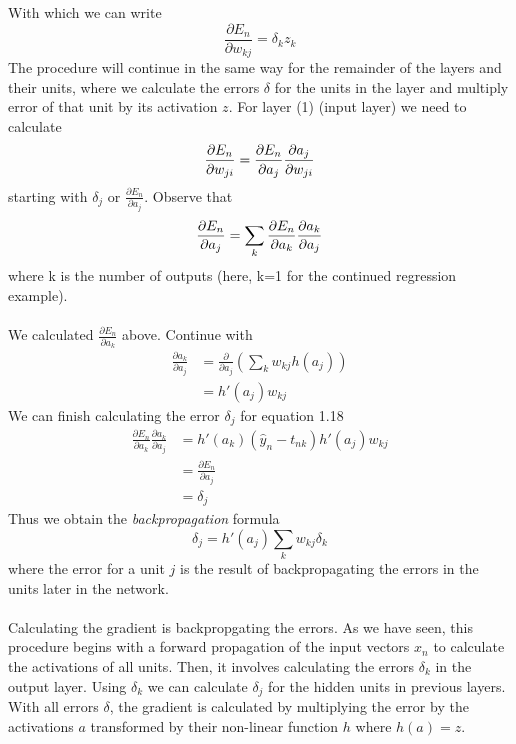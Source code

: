 With which we can write
\begin{equation}
    \frac{\partial{E_n}}{\partial w_{kj}} = \delta_{k}z_{k}
\end{equation}
The procedure will continue in the same way for the remainder of the layers and their 
units, where we calculate the errors $\delta$ for the units in the layer and multiply 
error of that unit by its activation $z$. For layer (1) (input layer) we need to calculate
\begin{equation}
    \frac{\partial E_n}{\partial w_{ji}} = \frac{\partial E_n}{\partial a_j} \\
    \frac{\partial a_j}{\partial w_{ji}}
\end{equation}
starting with $\delta_{j}$ or $\frac{\partial E_{n}}{\partial a_{j}}$. 
Observe that 
\begin{equation}
    \frac{\partial E_n}{\partial a_j} = \sum_{k} \\
    \frac{\partial E_n}{\partial a_{k}} \frac{\partial a_{k}}{\partial a_{j}}
\end{equation} where k is the number of outputs (here, k=1 for the continued
regression example).
\\\\
We calculated $\frac{\partial E_{n}}{\partial a_{k}}$ above. Continue with 
\begin{equation}
    \begin{split}
    \frac{\partial a_k}{\partial a_{j}} &= \frac{\partial}{\partial a_{j}} \left( \sum_{k} w_{kj}h(a_{j}) \right) \\
    &= h'(a_{j})w_{kj}
    \end{split}
\end{equation} 
We can finish calculating the error $\delta_{j}$ for equation 1.18
\begin{equation}
    \begin{split}
    \frac{\partial E_n}{\partial a_k} \frac{\partial a_k}{\partial a_{j}} &= h'(a_k)(\hat{y}_n - t_{nk}) h'(a_{j}) w_{kj} \\
    &= \frac{\partial E_n}{\partial a_j} \\
    & = \delta_{j}
    \end{split}
\end{equation} 
Thus we obtain the \textit{backpropagation} formula
\begin{equation}
    \delta_{j} = h'(a_{j}) \sum_{k} w_{kj} \delta_{k}
\end{equation} where the error for a unit $j$ is the result of backpropagating the errors 
in the units later in the network.
\\\\
Calculating the gradient is backpropgating the errors. As we have seen, this
procedure begins with a forward propagation of the input vectors $x_{n}$ to
calculate the activations of all units. Then, it involves calculating the 
errors $\delta_{k}$ in the output layer. Using $\delta_{k}$ we can calculate
$\delta_{j}$ for the hidden units in previous layers. With all errors 
$\delta$, the gradient is calculated by multiplying the error by the 
activations $a$ transformed by their non-linear function $h$ where $h(a) = z$.
\\\\
